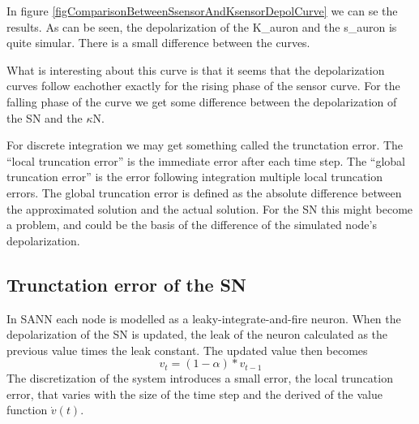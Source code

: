 In figure \ref{figComparisonBetweenSsensorAndKsensorDepolCurve} we can se the results. 
As can be seen, the depolarization of the K\_auron and the s\_auron is quite simular.
There is a small difference between the curves.

What is interesting about this curve is that it seems that the depolarization curves follow eachother exactly %
for the rising phase of the sensor curve. For the falling phase of the curve we get some difference between the depolarization of the SN and the $\kappa$N.

For discrete integration we may get something called the trunctation error. The ``local truncation error'' is the immediate error after each time step. 
The ``global truncation error'' is the error following integration multiple local truncation errors. %
The global truncation error is defined as the absolute difference between the approximated solution and the actual solution. 
For the SN this might become a problem, and could be the basis of the difference of the simulated node's depolarization.%





	\subsection{Trunctation error of the SN} %
	\label{ssecTruncationErrorOfSN}
In SANN each node is modelled as a leaky-integrate-and-fire neuron.
When the depolarization of the SN is updated, the leak of the neuron calculated as the previous value times the leak constant.
The updated value then becomes %
\begin{equation} %
	v_t =  (1-\alpha) * v_{t-1}  
\end{equation}
The discretization of the system introduces a small error, the local truncation error, that varies with the size of the time step and the derived of the value function $\dot{v}(t)$. %

